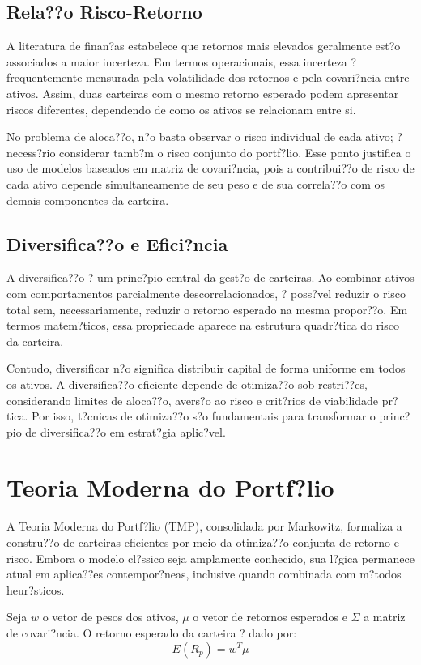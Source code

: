 ﻿\documentclass[
  12pt,
  oneside,
  a4paper,
  brazil
]{abntex2}
\begin{document}
\subsection{Rela??o Risco-Retorno}
A literatura de finan?as estabelece que retornos mais elevados geralmente est?o associados a maior incerteza. Em termos operacionais, essa incerteza ? frequentemente mensurada pela volatilidade dos retornos e pela covari?ncia entre ativos. Assim, duas carteiras com o mesmo retorno esperado podem apresentar riscos diferentes, dependendo de como os ativos se relacionam entre si.

No problema de aloca??o, n?o basta observar o risco individual de cada ativo; ? necess?rio considerar tamb?m o risco conjunto do portf?lio. Esse ponto justifica o uso de modelos baseados em matriz de covari?ncia, pois a contribui??o de risco de cada ativo depende simultaneamente de seu peso e de sua correla??o com os demais componentes da carteira.

\subsection{Diversifica??o e Efici?ncia}
A diversifica??o ? um princ?pio central da gest?o de carteiras. Ao combinar ativos com comportamentos parcialmente descorrelacionados, ? poss?vel reduzir o risco total sem, necessariamente, reduzir o retorno esperado na mesma propor??o. Em termos matem?ticos, essa propriedade aparece na estrutura quadr?tica do risco da carteira.

Contudo, diversificar n?o significa distribuir capital de forma uniforme em todos os ativos. A diversifica??o eficiente depende de otimiza??o sob restri??es, considerando limites de aloca??o, avers?o ao risco e crit?rios de viabilidade pr?tica. Por isso, t?cnicas de otimiza??o s?o fundamentais para transformar o princ?pio de diversifica??o em estrat?gia aplic?vel.

\section{Teoria Moderna do Portf?lio}
A Teoria Moderna do Portf?lio (TMP), consolidada por Markowitz, formaliza a constru??o de carteiras eficientes por meio da otimiza??o conjunta de retorno e risco. Embora o modelo cl?ssico seja amplamente conhecido, sua l?gica permanece atual em aplica??es contempor?neas, inclusive quando combinada com m?todos heur?sticos.

Seja $w$ o vetor de pesos dos ativos, $\mu$ o vetor de retornos esperados e $\Sigma$ a matriz de covari?ncia. O retorno esperado da carteira ? dado por:
\[
E(R_p)=w^T\mu
\]
\end{document}
